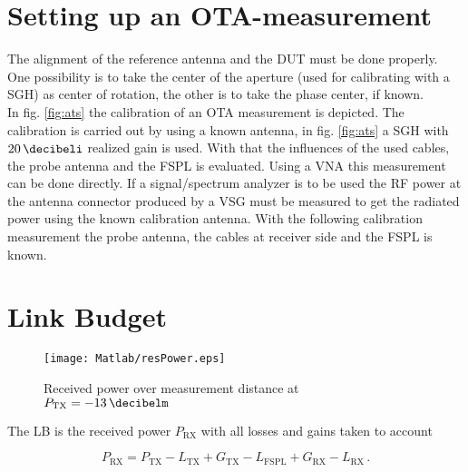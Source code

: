 \section{Setting up an OTA-measurement}
\label{sec:setupota}

The alignment of the reference antenna and the \ac{DUT} must be done properly. One possibility is to take the center of the aperture (used for calibrating with a \ac{SGH}) as center of rotation, the other is to take the phase center, if known.\\
In fig. \ref{fig:ats} the calibration of an \ac{OTA} measurement is depicted. The calibration is carried out by using a known antenna, in fig. \ref{fig:ats} a \ac{SGH} with $\SI{20}{\decibeli}$ realized gain is used. With that the influences of the used cables, the probe antenna and the \ac{FSPL} is evaluated. Using a \ac{VNA} this measurement can be done directly. If a signal/spectrum analyzer is to be used the \ac{RF} power at the antenna connector produced by a \ac{VSG} must be measured to get the radiated power using the known calibration antenna. With the following calibration measurement the probe antenna, the cables at receiver side and the \ac{FSPL} is known. \cite{ctiaat}

\section{Link Budget}

\begin{figure}[H]
\centering
\texttt{[image: Matlab/resPower.eps]}
\caption{Received power over measurement distance at $P_{\text{TX}}=\SI{-13}{\decibelm}$}
\label{fig:resP}
\end{figure}

The \ac{LB} is the received power $P_{\text{RX}}$ with all losses and gains taken to account

\begin{equation}
P_{\text{RX}} = P_{\text{TX}}-L_{\text{TX}}+G_{\text{TX}}-L_{\text{FSPL}} + G_{\text{RX}}-L_{\text{RX}}\,.
\end{equation}

